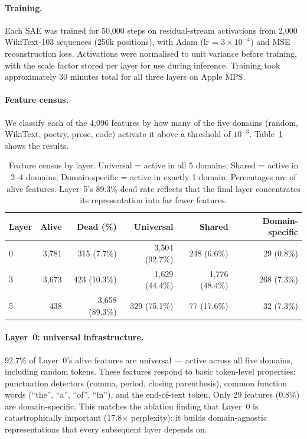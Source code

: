 \documentclass[11pt,a4paper]{article}
\begin{document}
\paragraph{Training.}
Each SAE was trained for 50{,}000 steps on residual-stream activations from 2{,}000 WikiText-103 sequences (256k positions), with Adam (lr = $3 \times 10^{-4}$) and MSE reconstruction loss.
Activations were normalised to unit variance before training, with the scale factor stored per layer for use during inference.
Training took approximately 30 minutes total for all three layers on Apple MPS.

\paragraph{Feature census.}
We classify each of the 4{,}096 features by how many of the five domains (random, WikiText, poetry, prose, code) activate it above a threshold of $10^{-3}$.
Table~\ref{tab:feature-census} shows the results.

\begin{table}[h]
\centering
\begin{tabular}{lrrrrr}
\toprule
Layer & Alive & Dead (\%) & Universal & Shared & Domain-specific \\
\midrule
0 & 3{,}781 & 315 (7.7\%) & 3{,}504 (92.7\%) & 248 (6.6\%) & 29 (0.8\%) \\
3 & 3{,}673 & 423 (10.3\%) & 1{,}629 (44.4\%) & 1{,}776 (48.4\%) & 268 (7.3\%) \\
5 & 438 & 3{,}658 (89.3\%) & 329 (75.1\%) & 77 (17.6\%) & 32 (7.3\%) \\
\bottomrule
\end{tabular}
\caption{Feature census by layer. Universal = active in all 5 domains; Shared = active in 2--4 domains; Domain-specific = active in exactly 1 domain. Percentages are of alive features. Layer~5's 89.3\% dead rate reflects that the final layer concentrates its representation into far fewer features.}
\label{tab:feature-census}
\end{table}

\paragraph{Layer~0: universal infrastructure.}
92.7\% of Layer~0's alive features are universal --- active across all five domains, including random tokens.
These features respond to basic token-level properties: punctuation detectors (comma, period, closing parenthesis), common function words (``the'', ``a'', ``of'', ``in''), and the end-of-text token.
Only 29 features (0.8\%) are domain-specific.
This matches the ablation finding that Layer~0 is catastrophically important (17.8$\times$ perplexity): it builds domain-agnostic representations that every subsequent layer depends on.
\end{document}
